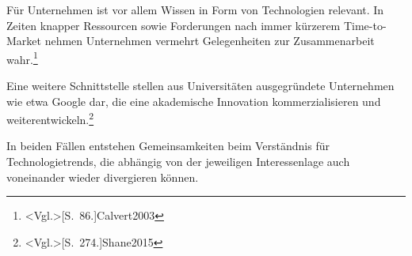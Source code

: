 Für Unternehmen ist vor allem Wissen in Form von Technologien relevant. In Zeiten knapper Ressourcen sowie Forderungen nach immer kürzerem Time-to-Market nehmen Unternehmen vermehrt Gelegenheiten zur Zusammenarbeit wahr.\footnote{\citeNP<Vgl.>[S.~86.]{Calvert2003}}

Eine weitere Schnittstelle stellen aus Universitäten ausgegründete Unternehmen wie etwa Google dar, die eine akademische Innovation kommerzialisieren und weiterentwickeln.\footnote{\citeNP<Vgl.>[S.~274.]{Shane2015}}

In beiden Fällen entstehen Gemeinsamkeiten beim Verständnis für Technologietrends, die abhängig von der jeweiligen Interessenlage auch voneinander wieder divergieren können.